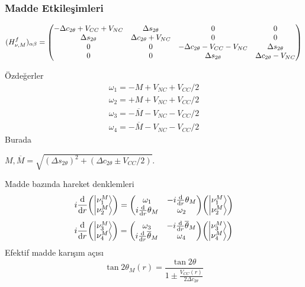 \documentclass[10pt]{beamer}
\begin{document}
\begin{frame}
    \frametitle{Madde Etkileşimleri}
    \hrulefill
    \tiny
    \begin{align*}
        (H^{f}_{\nu,M})_{\alpha\beta} =\mqty(-\Delta c_{ 2\theta}+V_{CC}+V_{NC} & \Delta s_{ 2\theta} & 0 & 0\\ \Delta s_{ 2\theta} & \Delta c_{ 2\theta}+V_{NC} & 0 & 0 \\0 & 0 & -\Delta c_{ 2\theta}-V_{CC}-V_{NC} & \Delta s_{ 2\theta}\\ 0 & 0 & \Delta s_{ 2\theta} & \Delta c_{ 2\theta}-V_{NC} )
    \end{align*}
    \normalsize
    \hrulefill

    \begin{minipage}{0.45\textwidth}
    Özdeğerler
    \tiny
    \begin{align*}
        \omega_{1} = {-M + V_{NC}+ V_{CC}/2} \\
        \omega_{2} = {+M + V_{NC}+ V_{CC}/2} \\
        \omega_{3} = {-\overline{M} - V_{NC}- V_{CC}/2}\\
        \omega_{4} = {-\overline{M} - V_{NC}- V_{CC}/2}
    \end{align*}
    \normalsize
    Burada

    {\tiny $ M, \overline{M} = \sqrt{(\Delta s_{ 2\theta})^{2}+(\Delta c_{2\theta} \pm V_{CC}/2 ) } $}.

    \end{minipage}
    \hfill
    \begin{minipage}{0.45\textwidth}
        Madde bazında hareket denklemleri
        \tiny
        \begin{equation*}
            i \dv{r} \mqty(\ket{\nu^{M}_{1}}\\ \ket{\nu^{M}_{2}}) = \mqty(\omega_{1} & -i \dv{r}\theta_{M} \\ i \dv{r}\theta_{M} & \omega_{2}) \mqty(\ket{\nu^{M}_{1}}\\ \ket{\nu^{M}_{2}})
        \end{equation*}
        \begin{equation*}
	        i \dv{r} \mqty(\ket{\nu^{M}_{3}}\\ \ket{\nu^{M}_{4}}) = \mqty(\omega_{3} & -i \dv{r}\overline{\theta}_{M} \\ i \dv{r}\overline{\theta}_{M} & \omega_{4}) \mqty(\ket{\nu^{M}_{3}}\\ \ket{\nu^{M}_{4}})
        \end{equation*}
        \normalsize
        Efektif madde karışım açısı
        \begin{equation*}
            \tan 2\theta_{M}(r) = \frac{\tan 2\theta}{1\pm \frac{V_{CC}(r)}{2\Delta c_{2\theta}}}
        \end{equation*}
    \end{minipage}
\end{frame}
\end{document}
